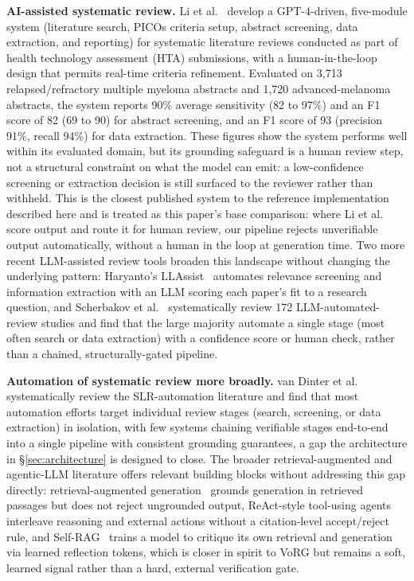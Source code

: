\documentclass[11pt]{article}
\begin{document}
\textbf{AI-assisted systematic review.} Li et al.~\cite{li2025enhancing} develop a GPT-4-driven, five-module system (literature search, PICOs criteria setup, abstract screening, data extraction, and reporting) for systematic literature reviews conducted as part of health technology assessment (HTA) submissions, with a human-in-the-loop design that permits real-time criteria refinement. Evaluated on 3{,}713 relapsed/refractory multiple myeloma abstracts and 1{,}720 advanced-melanoma abstracts, the system reports 90\% average sensitivity (82 to 97\%) and an F1 score of 82 (69 to 90) for abstract screening, and an F1 score of 93 (precision 91\%, recall 94\%) for data extraction. These figures show the system performs well within its evaluated domain, but its grounding safeguard is a human review step, not a structural constraint on what the model can emit: a low-confidence screening or extraction decision is still surfaced to the reviewer rather than withheld. This is the closest published system to the reference implementation described here and is treated as this paper's base comparison: where Li et al.~\cite{li2025enhancing} score output and route it for human review, our pipeline rejects unverifiable output automatically, without a human in the loop at generation time. Two more recent LLM-assisted review tools broaden this landscape without changing the underlying pattern: Haryanto's LLAssist~\cite{haryanto2024llassist} automates relevance screening and information extraction with an LLM scoring each paper's fit to a research question, and Scherbakov et al.~\cite{scherbakov2025emergence} systematically review 172 LLM-automated-review studies and find that the large majority automate a single stage (most often search or data extraction) with a confidence score or human check, rather than a chained, structurally-gated pipeline.

\textbf{Automation of systematic review more broadly.} van Dinter et al.~\cite{vandinter2021automation} systematically review the SLR-automation literature and find that most automation efforts target individual review stages (search, screening, or data extraction) in isolation, with few systems chaining verifiable stages end-to-end into a single pipeline with consistent grounding guarantees, a gap the architecture in \S\ref{sec:architecture} is designed to close. The broader retrieval-augmented and agentic-LLM literature offers relevant building blocks without addressing this gap directly: retrieval-augmented generation~\cite{lewis2020retrieval} grounds generation in retrieved passages but does not reject ungrounded output, ReAct-style tool-using agents~\cite{yao2023react} interleave reasoning and external actions without a citation-level accept/reject rule, and Self-RAG~\cite{asai2024selfrag} trains a model to critique its own retrieval and generation via learned reflection tokens, which is closer in spirit to VoRG but remains a soft, learned signal rather than a hard, external verification gate.
\end{document}
